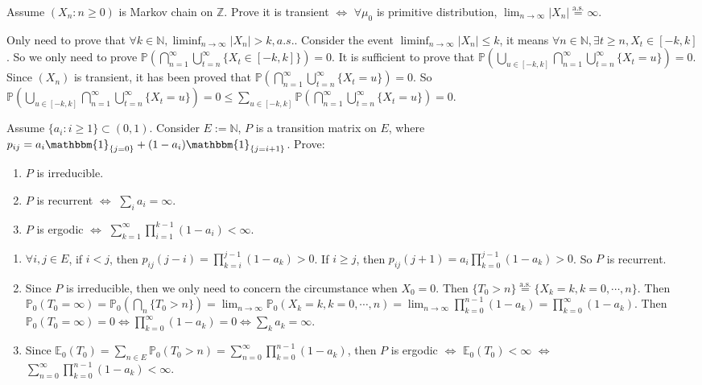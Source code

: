 \documentclass{ctexart}
\begin{document}
\begin{problem}\label{pro:4}
  Assume \((X_n:n \geq 0)\) is Markov chain on \(\mathbb{Z}\). Prove it is transient \(\iff\)
  \(\forall \mu_0\) is primitive distribution, \(\lim_{n \to \infty} |X_n| \overset{\text{a.s.}}{=} \infty\).
\end{problem}
\begin{solution}
  Only need to prove that \(\forall k \in \mathbb{N},\liminf_{n \to \infty}|X_n|>k,a. s.\).
  Consider the event \(\liminf_{n \to \infty}|X_n|\leq k\), it means \(\forall n \in \mathbb{N},\exists t \geq n,X_t \in [-k,k]\).
  So we only need to prove \(\mathbb{P}\left(\bigcap_{n=1}^{\infty} \bigcup_{t=n}^{\infty} \{X_t \in [-k,k]\}\right)=0\).
  It is sufficient to prove that \(\mathbb{P}(\bigcup_{u \in [-k,k]}\bigcap_{n=1}^{\infty} \bigcup_{t=n}^{\infty} \{X_t=u\})=0\).
  Since \((X_n)\) is transient, it has been proved that \(\mathbb{P}(\bigcap_{n=1}^{\infty} \bigcup_{t=n}^{\infty} \{X_t=u\})=0\).
  So \(\mathbb{P}(\bigcup_{u \in [-k,k]}\bigcap_{n=1}^{\infty} \bigcup_{t=n}^{\infty} \{X_t=u\})=0 \leq \sum_{u \in [-k,k]}\mathbb{P}(\bigcap_{n=1}^{\infty} \bigcup_{t=n}^{\infty} \{X_t=u\})=0\).
\end{solution}
\begin{problem}\label{pro:5}
  Assume \(\{a_i: i \geq 1\} \subset (0,1)\). Consider \(E:=\mathbb{N}\), \(P\) is a transition matrix on \(E\),
  where \(p_{ij}=a_i \mathbbm{1}_{\{j=0\}} + (1-a_i)\mathbbm{1}_{\{j=i+1\}}\).
  Prove:
  \begin{enumerate}
    \item \(P\) is irreducible.
    \item \(P\) is recurrent \( \iff \) \(\sum_{i}a_i=\infty\).
    \item \(P\) is ergodic \(\iff \) \(\sum_{k=1}^{\infty} \prod_{i=1}^{k-1} (1-a_i)< \infty\).
  \end{enumerate}
\end{problem}
\begin{solution}
  \begin{enumerate}
    \item \(\forall i, j \in E\), if \(i < j\), then \(p_{ij}(j-i)=\prod_{k=i}^{j-1}(1-a_k)>0\). If \(i \geq j\), then \(p_{ij}(j + 1)=a_i \prod_{k=0}^{j-1} (1-a_k)>0\).
      So \(P\) is recurrent.
    \item Since \(P\) is irreducible, then we only need to concern the circumstance when \(X_0=0\). Then \(\{T_0 > n\} \overset{\text{a.s.}}{=}\{X_k=k,k=0,\cdots,n\}\).
      Then \(\mathbb{P}_0(T_0 = \infty)=\mathbb{P}_0(\bigcap_{n}\{T_0 > n\})=\lim_{n \to \infty}\mathbb{P}_0(X_k=k,k=0,\cdots,n)=\lim_{n \to \infty}\prod_{k=0}^{n-1} (1-a_k) =\prod_{k=0}^{\infty} (1-a_k) \).
      Then \(\mathbb{P}_0(T_0=\infty)=0 \iff \prod_{k=0}^{\infty} (1-a_k) =0\iff \sum_{k}a_k=\infty\).
    \item Since \(\mathbb{E}_0(T_0)=\sum_{n \in E}\mathbb{P}_0(T_0 >n)=\sum_{n=0}^{\infty} \prod_{k=0}^{n-1} (1-a_k)\), then \(P\) is ergodic
      \(\iff \) \(\mathbb{E}_0(T_0) < \infty\) \(\iff\) \(\sum_{n=0}^{\infty} \prod_{k=0}^{n-1} (1-a_k) <\infty\).
  \end{enumerate}
\end{solution}
\end{document}
